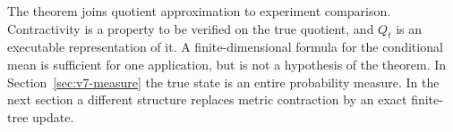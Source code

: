 The theorem joins quotient approximation to experiment comparison.
Contractivity is a property to be verified on the true quotient, and
$Q_t$ is an executable representation of it. A finite-dimensional
formula for the conditional mean is sufficient for one application,
but is not a hypothesis of the theorem. In
Section~\ref{sec:v7-measure} the true state is an entire probability
measure. In the next section a different structure replaces metric
contraction by an exact finite-tree update.
